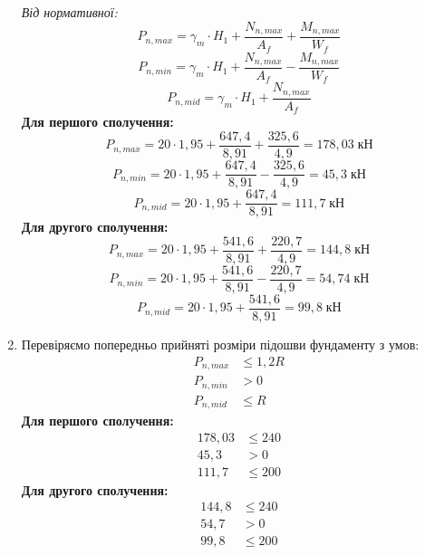 \documentclass[a4paper,14pt]{article}
\begin{document}
\begin{enumerate}
    \textit{Від нормативної:}
    \begin{equation}
        P_{n,max} = \gamma_m \cdot H_1 + \dfrac{N_{n,max}}{A_f} + \dfrac{M_{n,max}}{W_f}
    \end{equation}
    \begin{equation}
        P_{n,min} = \gamma_m \cdot H_1 + \dfrac{N_{n,max}}{A_f} - \dfrac{M_{n,max}}{W_f}
    \end{equation}
    \begin{equation}
        P_{n,mid} = \gamma_m \cdot H_1 + \dfrac{N_{n,max}}{A_f}
    \end{equation}
    \textbf{Для першого сполучення:}
    $$P_{n,max} = 20 \cdot 1,95 + \dfrac{647,4}{8,91} + \dfrac{325,6}{4,9} = 178,03\;\textit{кН}$$
    $$P_{n,min} = 20 \cdot 1,95 + \dfrac{647,4}{8,91} - \dfrac{325,6}{4,9} = 45,3\;\textit{кН}$$
    $$P_{n,mid} = 20 \cdot 1,95 + \dfrac{647,4}{8,91} = 111,7\;\textit{кН}$$
    \textbf{Для другого сполучення:}
    $$P_{n,max} = 20 \cdot 1,95 + \dfrac{541,6}{8,91} + \dfrac{220,7}{4,9} = 144,8\;\textit{кН}$$
    $$P_{n,min} = 20 \cdot 1,95 + \dfrac{541,6}{8,91} - \dfrac{220,7}{4,9} = 54,74\;\textit{кН}$$
    $$P_{n,mid} = 20 \cdot 1,95 + \dfrac{541,6}{8,91} = 99,8\;\textit{кН}$$
    \item Перевіряємо попередньо прийняті розміри підошви фундаменту з умов:
        \begin{equation}
        \begin{aligned}
            P_{n,max} &\leq 1,2R\\
            P_{n,min} &> 0\\
            P_{n,mid} &\leq R
        \end{aligned}
        \end{equation} 
    \textbf{Для першого сполучення:}
    \begin{equation*}
        \begin{aligned}
            178,03 &\leq 240\\
            45,3 &> 0\\
            111,7 &\leq 200
        \end{aligned}
        \end{equation*}
    \textbf{Для другого сполучення:}
    \begin{equation*}
        \begin{aligned}
            144,8 &\leq 240\\
            54,7 &> 0\\
            99,8 &\leq 200
        \end{aligned}

\end{equation*}
\end{enumerate}
\end{document}

